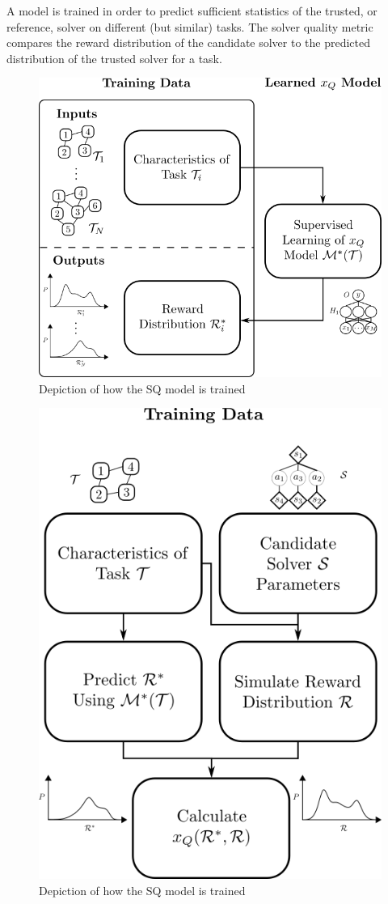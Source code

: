     A model is trained in order to predict sufficient statistics of the trusted, or reference, solver \solvestar{} on different (but similar) tasks. The solver quality metric compares the reward distribution of the candidate solver to the predicted distribution of the trusted solver for a task.

    \begin{figure}[tbp]
        \centering
        \includegraphics[width=0.7\linewidth]{Figures/SQ_train.png}
        \caption{Depiction of how the SQ model is trained}
        \label{fig:sq_train}
    \end{figure}%

    \begin{figure}[tbp]
        \centering
        \includegraphics[width=0.7\linewidth]{Figures/SQ_test.png}
        \caption{Depiction of how the SQ model is trained}
        \label{fig:sq_train}
    \end{figure}

